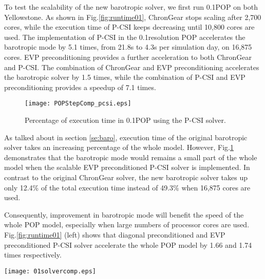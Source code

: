 To test the scalability of the new barotropic solver, we first run 0.1\degree POP on both Yellowstone.
As shown in Fig.\ref{fig:runtime01}, ChronGear stops scaling after 2,700 cores, while the execution time of P-CSI keeps decreasing until 10,800 cores are used. 
The implementation of P-CSI in the 0.1\degree resolution POP accelerates the barotropic mode by 5.1 times, from 21.8s to 4.3s per simulation day, on 16,875 cores.
EVP preconditioning provides a further acceleration to both ChronGear and P-CSI. 
The combination of ChronGear and EVP preconditioning accelerates the barotropic solver by 1.5 times,
while the combination of P-CSI and EVP preconditioning provides a speedup of 7.1 times.
\begin {figure}
\centering
\vspace{-10pt}
\texttt{[image: POPStepComp\_pcsi.eps]}
\caption[] {Percentage of execution time in 0.1\degree POP using the P-CSI solver.\label{fig:StepComp_pcsi}}
\vspace{-10pt}
\end{figure}

As talked about in section \ref{se:baro}, execution time of the original barotropic solver takes an increasing percentage of the whole model. 
However, Fig.\ref{fig:StepComp_pcsi} demonstrates that the barotropic mode would remains a small part of the whole model when the scalable EVP preconditioned P-CSI solver is implemented.  
In contrast to the original ChronGear solver, the new barotropic solver takes up only 12.4\% of the total execution time instead of 49.3\% when 16,875 cores are used. 

Consequently, improvement in barotropic mode will benefit the speed of the whole POP model, especially when large numbers of processor cores are used. 
Fig.\ref{fig:runtime01} (left) shows that diagonal preconditioned and EVP preconditioned P-CSI solver accelerate the whole POP model by 1.66 and 1.74 times respectively. 


%
\begin{figure*}[!t]
\begin{center}
	\texttt{[image: 01solvercomp.eps]}
\end{center}
\caption[] {Time components of barotropic solvers in 0.1\degree POP. Four kinds of solvers are ChronGear or P-CSI with a diagonal preconditioner or an EVP preconditioner. (a) Execution time of global reduction, (b) Execution time of boundary communication, (c) Execution time of computing. }
\label{fig:component}
\end{figure*}

